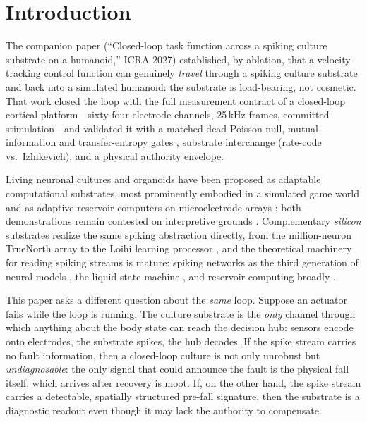 \section{Introduction}

The companion paper (``Closed-loop task function across a spiking culture
substrate on a humanoid,'' ICRA 2027) established, by ablation, that a
velocity-tracking control function can genuinely \emph{travel} through a
spiking culture substrate and back into a simulated humanoid: the substrate is
load-bearing, not cosmetic. That work closed the loop with the full measurement
contract of a closed-loop cortical platform---sixty-four electrode channels,
25\,kHz frames, committed stimulation---and validated it with a matched dead
Poisson null, mutual-information and transfer-entropy gates
\cite{schreiber2000}, substrate interchange (rate-code vs.\ Izhikevich), and a
physical authority envelope.

Living neuronal cultures and organoids have been proposed as adaptable
computational substrates, most prominently embodied in a simulated game world
\cite{kagan2022dishbrain} and as adaptive reservoir computers on
microelectrode arrays \cite{cai2023brainoware}; both demonstrations remain
contested on interpretive grounds \cite{balci2023neurons,kagan2023semantics}.
Complementary \emph{silicon} substrates realize the same spiking abstraction
directly, from the million-neuron TrueNorth array \cite{merolla2014} to the
Loihi learning processor \cite{davies2018loihi}, and the theoretical machinery
for reading spiking streams is mature: spiking networks as the third generation
of neural models \cite{maass1997}, the liquid state machine
\cite{maass2002liquid}, and reservoir computing broadly \cite{verstraeten2007}.

This paper asks a different question about the \emph{same} loop. Suppose an
actuator fails while the loop is running. The culture substrate is the
\emph{only} channel through which anything about the body state can reach the
decision hub: sensors encode onto electrodes, the substrate spikes, the hub
decodes. If the spike stream carries no fault information, then a closed-loop
culture is not only unrobust but \emph{undiagnosable}: the only signal that
could announce the fault is the physical fall itself, which arrives after
recovery is moot. If, on the other hand, the spike stream carries a detectable,
spatially structured pre-fall signature, then the substrate is a diagnostic
readout even though it may lack the authority to compensate.

